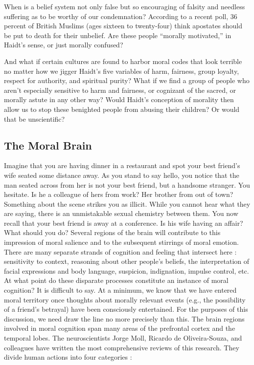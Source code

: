\documentclass[a4paper,14pt]{extbook}
\begin{document}
When is a belief system not only false but so encouraging of falsity and needless suffering as to be worthy of our condemnation?
According to a recent poll, 36 percent of British Muslims (ages sixteen to twenty-four) think apostates should be put to death for their unbelief.
Are these people ``morally motivated,'' in Haidt's sense, or just morally confused?

And what if certain cultures are found to harbor moral codes that look terrible no matter how we jigger Haidt's five variables of harm, fairness, group loyalty, respect for authority, and spiritual purity?
What if we find a group of people who aren't especially sensitive to harm and fairness, or cognizant of the sacred, or morally astute in any other way?
Would Haidt's conception of morality then allow us to stop these benighted people from abusing their children?
Or would that be unscientific?

\subsection{The Moral Brain}

Imagine that you are having dinner in a restaurant and spot your best friend's wife seated some distance away.
As you stand to say hello, you notice that the man seated across from her is not your best friend, but a handsome stranger.
You hesitate.
Is he a colleague of hers from work?
Her brother from out of town?
Something about the scene strikes you as illicit.
While you cannot hear what they are saying, there is an unmistakable sexual chemistry between them.
You now recall that your best friend is away at a conference.
Is his wife having an affair?
What should you do?
Several regions of the brain will contribute to this impression of moral salience and to the subsequent stirrings of moral emotion.
There are many separate strands of cognition and feeling that intersect here :
sensitivity to context, reasoning about other people's beliefs, the interpretation of facial expressions and body language, suspicion, indignation, impulse control, etc.
At what point do these disparate processes constitute an instance of moral cognition?
It is difficult to say.
At a minimum, we know that we have entered moral territory once thoughts about morally relevant events (e.g., the possibility of a friend's betrayal) have been consciously entertained.
For the purposes of this discussion, we need draw the line no more precisely than this.
The brain regions involved in moral cognition span many areas of the prefrontal cortex and the temporal lobes.
The neuroscientists Jorge Moll, Ricardo de Oliveira-Souza, and colleagues have written the most comprehensive reviews of this research.
They divide human actions into four categories :
\end{document}
